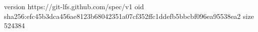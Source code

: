 version https://git-lfs.github.com/spec/v1
oid sha256:efc45b3dca456ae8123b68042351a07cf352ffc1ddefb5bbcbf096ea95538ea2
size 524384
